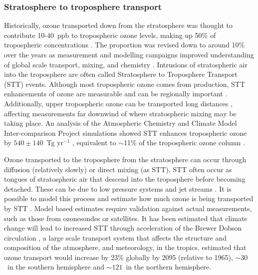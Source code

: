   \subsubsection{Stratosphere to troposphere transport}
    \label{LR:O3:STT}
    Historically, ozone transported down from the stratosphere was thought to contribute 10-40~ppb to tropospheric ozone levels, making up 50\% of tropospheric concentrations \parencite{Atkinson2000, Stohl2003}.
    The proportion was revised down to around 10\% over the years as measurement and modelling campaigns improved understanding of global scale transport, mixing, and chemistry \parencite{Guenther2006, Monks2015}.
    Intrusions of stratospheric air into the troposphere are often called Stratosphere to Troposphere Transport (STT) events.
    Although most tropospheric ozone comes from production, STT enhancements of 
    ozone are measurable and can be regionally important 
    \parencite[e.g.,][]{Jacobson2000, Lelieveld2009, Kuang2017}.
    Additionally, upper tropospheric ozone can be transported long distances 
    \parencite{Cooper2004}, affecting measurements far downwind of where 
    stratospheric mixing may be taking place.
    An analysis of the Atmospheric Chemistry and Climate Model Inter-comparison Project simulations showed STT enhances tropospheric ozone by $540\pm140$~Tg yr$^{-1}$ \parencite{Young2013}, equivalent to $\sim$11\% of the tropospheric ozone column \parencite{Monks2015}.
    
    
    Ozone transported to the troposphere from the stratosphere can occur through diffusion (relatively slowly) or direct mixing (as STT).
    STT often occur as tongues of stratospheric air that descend into the troposphere before becoming detached.
    These can be due to low pressure systems and jet streams \parencite{Sprenger2003,Alexander2013}.
    It is possible to model this process and estimate how much ozone is being 
    transported by STT \parencite[e.g.,][]{Young2013, Ojha2016}.
    Model based estimates require validation against actual measurements, such as those from ozonesondes or satellites.
    It has been estimated that climate change will lead to increased STT 
    through acceleration of the Brewer Dobson circulation 
    \parencite{Hegglin2009}, a large scale transport system that affects the 
    structure and composition of the atmosphere, and meteorology, in the 
    tropics.
    \textcite{Hegglin2009} estimated that ozone transport would increase by 
    23\% globally by 2095 (relative to 1965), $\sim 30$\tgpyr ~in the southern 
    hemisphere and $\sim 121$\tgpyr ~in the northern hemisphere.
    
